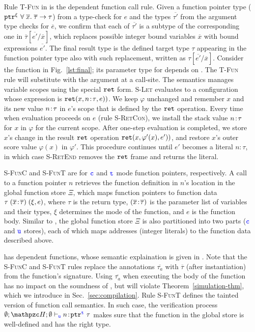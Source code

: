 Rule \textsc{T-Fun} in  is the dependent function call rule. 
Given a function pointer type ($\mathtt{ptr}^{\xi}~{\forall \;\overline{x}.\;{\overline{\tau}}\to\tau}$)
from a type-check for $e$ and the types $\overline{\tau'}$ from the argument type checks for $\overline{e}$,
we confirm that each of $\overline{\tau'}$ is
a subtype of the corresponding one in $\overline{\tau}[\overline{e'} / \overline{x}]$,
which replaces possible integer bound variables $\overline{x}$ with bound expressions $\overline{e'}$.
The final result type is the defined target type $\tau$ appearing in the function pointer type
also with such replacement, written as $\tau[\overline{e'} / \overline{x}]$.
Consider the  function in
Fig.~\ref{lst:final}; its parameter type for  
depends on . The \textsc{T-Fun} rule will substitute 
 with the argument at a call-site.
The semantics manages variable scopes using the special $\mathtt{ret}$
form. \textsc{S-Let} evaluates to a configuration whose expression is
$\mathtt{ret}({x},{{n}\!:\!{\tau}},{e}))$. We keep $\varphi$ unchanged
and remember $x$ and its new value ${n}\!:\!{\tau}$
in $e$'s scope that is defined by the $\mathtt{ret}$ operation.
Every time when evaluation proceeds on $e$ (rule \textsc{S-RetCon}),
we install the stack value ${n}\!:\!{\tau}$ for $x$ in $\varphi$ for the current scope.
After one-step evaluation is completed, 
we store $x$'s change in the result $\mathtt{ret}$ operation $\mathtt{ret}({x},{\varphi'(x)},{e'}))$,
and restore $x$'s outer score value $\varphi(x)$ in $\varphi'$. 
This procedure continues until $e'$ becomes a literal
$n\!:\!\tau$, in which case \textsc{S-RetEnd} removes the $\mathtt{ret}$ frame and returns
the literal. 

\textsc{S-FunC} and \textsc{S-FunT} are
for $\textcolor{blue}{\texttt{c}}$ and $\textcolor{blue}{\texttt{t}}$ mode function pointers, respectively. 
A call to a function pointer $n$ retrieves
 the function definition in $n$'s location in the global function store $\Xi$,
which maps function pointers to
function data $\tau\;({\overline{x}}\!:\!{\overline{\tau}})\;(\xi,e)$, where
$\tau$ is the return type, $({\overline{x}}\!:\!{\overline{\tau}})$
is the parameter list of variables and their types, 
$\xi$ determines the mode of the function, and $e$ is the
function body. 
Similar to \heap, the global function store $\Xi$ is also partitioned into
two parts ($\textcolor{blue}{\texttt{c}}$ and $\textcolor{blue}{\texttt{u}}$ stores), each of which
maps addresses (integer literals) to the function data described above.

\systemname{} has dependent functions, whose semantic explaination is given in .
Note that the \textsc{S-FunC} and \textsc{S-FunT} rules replace the
  annotations $\overline{\tau_a}$ with
  $\overline{\tau}$ (after instantiation) from the function's
  signature. Using $\overline{\tau_a}$ when executing the body of
the function has no impact on the soundness of \lang, but will violate
Theorem~\ref{simulation-thm}, which we introduce in Sec.~\ref{sec:compilation}.
Rule \textsc{S-FunT} defines the tainted version of function call semantics.
In such case, the verification process 
$\emptyset;\heap ; \emptyset \vdash_{\umode}\evalue{n}{\tptr{\tau}{\tmode}}$
makes sure that the function in the global store is well-defined and has the right type.

